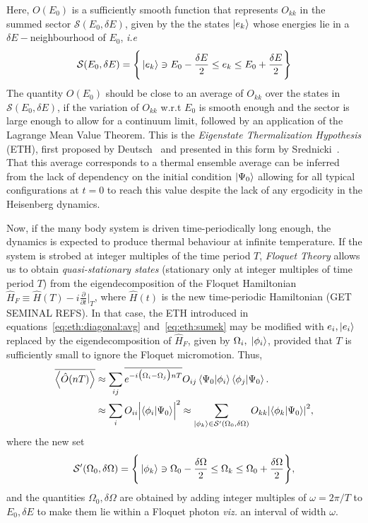 \documentclass[%
 reprint,
superscriptaddress,
 amsmath,amssymb,
 aps,
prb,
]{revtex4-2}
\begin{document}
Here, $O(E_0)$ is a sufficiently smooth function that represents $O_{kk}$ in the summed sector $\mathcal{S}(E_0, \delta E)$, given by the the states $\ket{e_k}$ whose energies lie in a $\delta E-$neighbourhood of $E_0$, \textit{i.e} 
\begin{equation}
	\mathcal{S}(E_0, \delta E) = \Bigg\{\ket{e_k}\ni E_0-\frac{\delta E}{2}\leq e_k \leq E_0+\frac{\delta E}{2}\Bigg\}\nonumber
\end{equation}
The quantity $O(E_0)$ should be close to an average of $O_{kk}$ over the states in $\mathcal{S}(E_0, \delta E)$, if the variation of $O_{kk}$ w.r.t $E_0$ is smooth enough and the sector is large enough to allow for a continuum limit, followed by an application of the Lagrange Mean Value Theorem. This is the \textit{Eigenstate Thermalization Hypothesis} (ETH), first proposed by Deutsch~\cite{Deutsch1991} and presented in this form by Srednicki~\cite{Srednicki1994}. That this average corresponds to a thermal ensemble average can be inferred from the lack of dependency on the initial condition $\ket{\Psi_0}$ allowing for all typical configurations at $t=0$ to reach this value despite the lack of any ergodicity in the Heisenberg dynamics.

Now, if the many body system is driven time-periodically long enough, the dynamics is expected to produce thermal behaviour at infinite temperature. If the system is strobed at integer multiples of the time period $T$, \emph{Floquet Theory} allows us to obtain \textit{quasi-stationary states} (stationary only at integer multiples of time period $T$) from the eigendecomposition of the Floquet Hamiltonian $\hat{H}_F\equiv \hat{H}(T) - i \frac{\partial}{\partial t}\vert_T$, where $\hat{H}(t)$ is the new time-periodic Hamiltonian (GET SEMINAL REFS). In that case, the ETH introduced in equations~\ref{eq:eth:diagonal:avg} and~\ref{eq:eth:sumek} may be modified with $e_i, \ket{e_i}$ replaced by the eigendecomposition of $\hat{H}_F$, given by $\Omega_i,\; \ket{\phi_i}$, provided that $T$ is sufficiently small to ignore the Floquet micromotion. Thus,
\begin{align}
	\overline{\ev{\hat{O}(nT)}} &\approx \sum_{ij}\overline{e^{-i\big(\Omega_i-\Omega_j\big)nT}}O_{ij} \ip{\Psi_0}{\phi_i}\ip{\phi_j}{\Psi_0}.\nonumber\\
	&\approx\sum_i O_{ii} \abs\Big{ \ip{\phi_i}{\Psi_0}}^2\approx \sum_{\ket{\phi_k}\in \mathcal{S}^\prime(\Omega_0, \delta \Omega)}O_{kk}\abs{\ip{\phi_k}{\Psi_0}}^2,
	\label{eq:floquet:eth:diagonal:avg}
\end{align}
where the new set
\begin{equation}
	\mathcal{S}^\prime(\Omega_0, \delta \Omega) = \Bigg\{\ket{\phi_k}\ni \Omega_0-\frac{\delta \Omega}{2}\leq \Omega_k \leq \Omega_0+\frac{\delta \Omega}{2}\Bigg\},\nonumber
\end{equation}
and the quantities $\Omega_0, \delta\Omega$ are obtained by adding integer multiples of $\omega=2\pi/T$ to $E_0, \delta E$ to make them lie within a Floquet photon \textit{viz.} an interval of width $\omega$.
\end{document}
